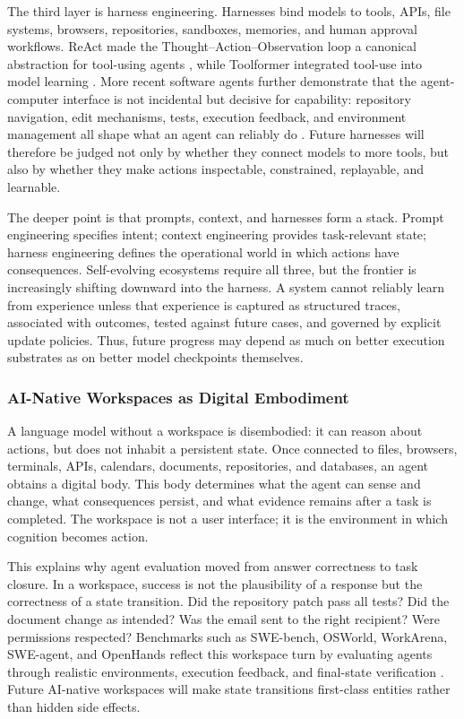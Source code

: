 The third layer is harness engineering. Harnesses bind models to tools, APIs, file systems, browsers, repositories, sandboxes, memories, and human approval workflows. ReAct made the Thought--Action--Observation loop a canonical abstraction for tool-using agents \citep{yao2022react}, while Toolformer integrated tool-use into model learning \citep{schick2023toolformer}. More recent software agents further demonstrate that the agent-computer interface is not incidental but decisive for capability: repository navigation, edit mechanisms, tests, execution feedback, and environment management all shape what an agent can reliably do \citep{yang2024sweagent,wang2024openhands}. Future harnesses will therefore be judged not only by whether they connect models to more tools, but also by whether they make actions inspectable, constrained, replayable, and learnable.

The deeper point is that prompts, context, and harnesses form a stack. Prompt engineering specifies intent; context engineering provides task-relevant state; harness engineering defines the operational world in which actions have consequences. Self-evolving ecosystems require all three, but the frontier is increasingly shifting downward into the harness. A system cannot reliably learn from experience unless that experience is captured as structured traces, associated with outcomes, tested against future cases, and governed by explicit update policies. Thus, future progress may depend as much on better execution substrates as on better model checkpoints themselves.



\subsubsection{AI-Native Workspaces as Digital Embodiment}




A language model without a workspace is disembodied: it can reason about actions, but does not inhabit a persistent state. Once connected to files, browsers, terminals, APIs, calendars, documents, repositories, and databases, an agent obtains a digital body. This body determines what the agent can sense and change, what consequences persist, and what evidence remains after a task is completed. The workspace is not a user interface; it is the environment in which cognition becomes action.

This explains why agent evaluation moved from answer correctness to task closure. In a workspace, success is not the plausibility of a response but the correctness of a state transition. Did the repository patch pass all tests? Did the document change as intended? Was the email sent to the right recipient? Were permissions respected? Benchmarks such as SWE-bench, OSWorld, WorkArena, SWE-agent, and OpenHands reflect this workspace turn by evaluating agents through realistic environments, execution feedback, and final-state verification \citep{jimenez2023swebench,xie2024osworld,drouin2024workarena,yang2024sweagent,wang2024openhands}. Future AI-native workspaces will make state transitions first-class entities rather than hidden side effects.

